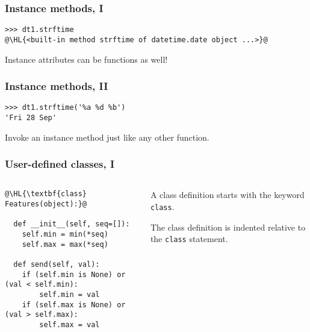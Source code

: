 \documentclass[english,serif,mathserif,xcolor=pdftex,dvipsnames,table]{beamer}
\begin{document}
\begin{frame}[fragile]
  \frametitle{Instance methods, I}
\begin{lstlisting}
>>> dt1.strftime
@\HL{<built-in method strftime of datetime.date object ...>}@
\end{lstlisting}

  \+ 
  Instance attributes can be functions as well!
\end{frame}


\begin{frame}[fragile]
  \frametitle{Instance methods, II}
\begin{lstlisting}
>>> dt1.strftime('%a %d %b')
'Fri 28 Sep'
\end{lstlisting}

  \+ 
  Invoke an instance method just like any other function.
\end{frame}




\begin{frame}[fragile]
  \frametitle{User-defined classes, I}
  \begin{columns}[t]
    \begin{column}{0.5\textwidth}
\begin{lstlisting}
@\HL{\textbf{class} Features(object):}@

  def __init__(self, seq=[]):
    self.min = min(*seq)
    self.max = max(*seq)

  def send(self, val):
    if (self.min is None) or (val < self.min):
        self.min = val
    if (self.max is None) or (val > self.max):
        self.max = val
\end{lstlisting}
    \end{column}
    \begin{column}{0.5\textwidth}
      \raggedleft 
      A class definition starts with the keyword \texttt{class}.

      The class definition is indented relative to the \texttt{class}
      statement.
    \end{column}
  \end{columns}
\end{frame}
\end{document}
